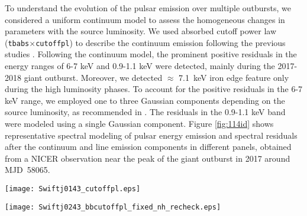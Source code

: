 \documentclass[twocolumn,trackchanges]{aastex631}
\begin{document}
 

To understand the evolution of the pulsar emission over multiple outbursts, we considered a uniform continuum model to assess the homogeneous changes in parameters with the source luminosity. 
We used absorbed cutoff power law  (\texttt{tbabs$\times$cutoffpl}) to describe the continuum emission following the previous studies \citep{2019ApJ...885...18J, 2020ApJ...902...18K}. Following the continuum model, the prominent positive residuals in the energy ranges of 6-7 keV and 0.9-1.1 keV were detected, mainly during the 2017-2018 giant outburst. Moreover, we detected $\approx$ 7.1~keV iron edge feature only during the high luminosity phases. To account for the positive residuals in the 6-7 keV range, we employed one to three Gaussian components depending on the source luminosity, as recommended in \citet{2019ApJ...885...18J}. The residuals in the 0.9-1.1 keV band were modeled using a single Gaussian component. Figure \ref{fig:114id} shows representative spectral modeling of pulsar energy emission and spectral residuals after the continuum and line emission components in different panels, obtained from a NICER observation near the peak of the giant outburst in 2017 around MJD~58065. 


\begin{figure*}
    \centering
    \texttt{[image: Swiftj0143\_cutoffpl.eps]}
    \caption{  The panels (a)-(c) show the evolution of the parameters such as column density ($N_{H}$), Photon Index ($PI$), and Cutoff energy ($E_{cut}$)  with luminosity obtained from multiple outbursts of Swift~J0243.6+6124. Panel (d) shows the relationship between the photon Index ($PI$) and cutoff energy ($E_{cut}$). The filled and open markers represent data points obtained from giant and subsequent normal outbursts, respectively.  The black points represent the values obtained from the 2023 outburst. 
    }
    \label{fig:spec_evolve_L}
\end{figure*}



\begin{figure*}
    \centering
    \texttt{[image: Swiftj0243\_bbcutoffpl\_fixed\_nh\_recheck.eps]}
    \caption{ The panels (a)-(d) show the luminosity dependencies of spectral parameters such as photon index ($PI$), cutoff energy ($E_{cut}$), blackbody temperature ($kT$), and blackbody radius at a fixed column density over multiple outbursts of Swift~J0243.6+6124. The symbols have the same meaning as  Figure~\ref{fig:spec_evolve_L}.
    }
    \label{fig:spec_evolve_L2}
\end{figure*}
\end{document}
